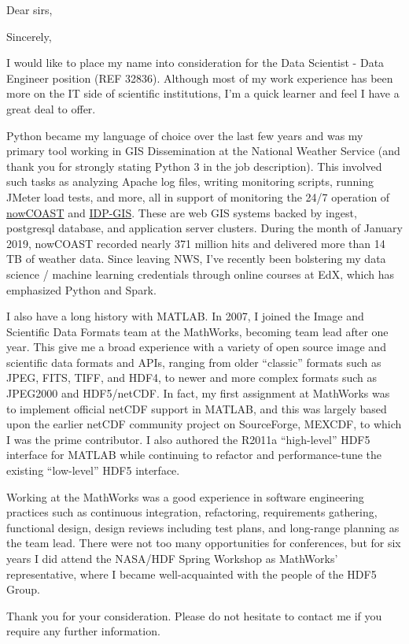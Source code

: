 \documentclass[11pt]{moderncv}  %
\begin{document}
\opening{Dear sirs,}
\closing{Sincerely,}


\makelettertitle

I would like to place my name into consideration for the 
Data Scientist - Data Engineer position
(REF 32836).
Although most of my work experience has been more on the IT side of
scientific institutions, I'm a quick learner and feel I have a great
deal to offer.

Python became my language of choice over the last few years and was
my primary tool working in GIS Dissemination at the National Weather
Service (and thank you for strongly stating Python 3 in the job description).  This involved such tasks as analyzing Apache log files,
writing monitoring scripts, running JMeter load tests, and more, all in
support of monitoring the 24/7 operation of \href{https://nowcoast.noaa.gov}{nowCOAST}
and \href{https://idpgis.ncep.noaa.gov}{IDP-GIS}.  These are web GIS systems backed by ingest, postgresql database, and application server clusters.  During the month of January 2019, nowCOAST
recorded nearly 371 million hits and delivered more than 14 TB of weather data.
Since leaving NWS, I've recently been bolstering my data science / machine learning
credentials through online courses at EdX, which has emphasized Python and Spark.

I also have a long history with MATLAB.  In 2007, I joined the Image
and Scientific Data Formats team at the MathWorks, becoming  team
lead after one year.  This give me a broad experience with a variety
of open source image and scientific data formats and APIs, ranging
from older “classic” formats such as JPEG, FITS, TIFF, and HDF4,
to newer and more complex formats such as JPEG2000 and HDF5/netCDF.
In fact, my first assignment at MathWorks was to implement official
netCDF support in MATLAB, and this was largely based upon the earlier
netCDF community project on SourceForge, MEXCDF, to which I was the
prime contributor.   I also authored the R2011a “high-level” HDF5
interface for MATLAB while continuing to refactor and performance-tune
the existing “low-level” HDF5 interface.

Working at the MathWorks was a good experience in software engineering
practices such as continuous integration, refactoring, requirements
gathering, functional design, design reviews including test plans,
and long-range planning as the team lead.   There were not too many
opportunities for conferences, but for six years I did attend the
NASA/HDF Spring Workshop as MathWorks’ representative, where I
became well-acquainted with the people of the HDF5 Group.

Thank you for your consideration.  Please do not hesitate to contact
me if you require any further information.

\makeletterclosing
\end{document}
